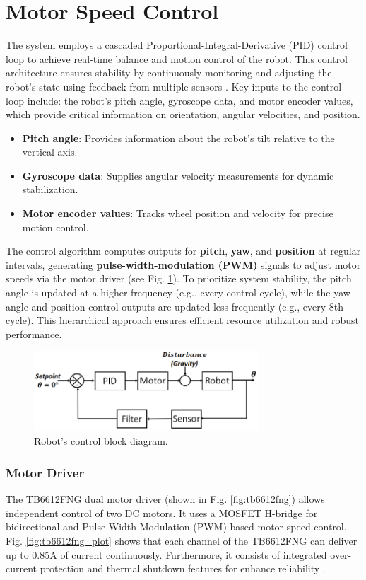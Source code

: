 
\section{Motor Speed Control}
The system employs a cascaded Proportional-Integral-Derivative (PID) control loop to achieve real-time balance and motion control of the robot. This control architecture ensures stability by continuously monitoring and adjusting the robot's state using feedback from multiple sensors \cite{jamil_modeling_2014}. Key inputs to the control loop include:
the robot's pitch angle, gyroscope data, and motor encoder values, which provide critical information on orientation, angular velocities, and position. 
\begin{itemize}
	\item \textbf{Pitch angle}: Provides information about the robot's tilt relative to the vertical axis.
	\item \textbf{Gyroscope data}: Supplies angular velocity measurements for dynamic stabilization.
	\item \textbf{Motor encoder values}: Tracks wheel position and velocity for precise motion control.
\end{itemize}

The control algorithm computes outputs for \textbf{pitch}, \textbf{yaw}, and \textbf{position} at regular intervals, generating \textbf{pulse-width-modulation (PWM)} signals to adjust motor speeds via the motor driver (see Fig. \ref{fig:control-loop-block-diagram}). To prioritize system stability, the pitch angle is updated at a higher frequency (e.g., every control cycle), while the yaw angle and position control outputs are updated less frequently (e.g., every 8th cycle). This hierarchical approach ensures efficient resource utilization and robust performance.

\begin{figure}[H]
	\centering
	\includegraphics[height=3cm]{assets/control-loop-block-diagram}
	\caption{Robot's control block diagram.}
	\label{fig:control-loop-block-diagram}
\end{figure}
\subsubsection{Motor Driver}
The TB6612FNG dual motor driver (shown in Fig. \ref{fig:tb6612fng}) allows independent control of two DC motors. It uses a MOSFET H-bridge for bidirectional and Pulse Width Modulation (PWM) based motor speed control. Fig. \ref{fig:tb6612fng_plot} shows that each channel of the TB6612FNG can deliver up to 0.85A of current continuously. Furthermore, it consists of integrated over-current protection and thermal shutdown features for enhance reliability \cite{TB6612FNG}.

